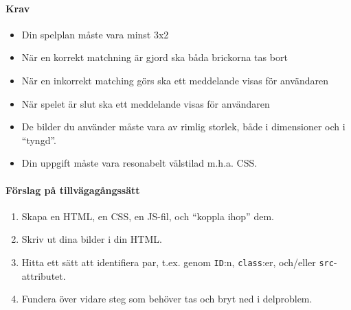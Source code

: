 \documentclass[12pt]{article}
\begin{document}
  \paragraph{Krav}
  \begin{itemize}
    \item Din spelplan måste vara minst 3x2
    \item När en korrekt matchning är gjord ska båda brickorna tas bort
    \item När en inkorrekt matching görs ska ett meddelande visas för användaren
    \item När spelet är slut ska ett meddelande visas för användaren
    \item De bilder du använder måste vara av rimlig storlek, både i dimensioner och i ``tyngd''.
    \item Din uppgift måste vara resonabelt välstilad m.h.a. CSS.
  \end{itemize}

  \paragraph{Förslag på tillvägagångssätt}
  \begin{enumerate}
    \item Skapa en HTML, en CSS, en JS-fil, och ``koppla ihop'' dem.
    \item Skriv ut dina bilder i din HTML.
    \item Hitta ett sätt att identifiera par, t.ex. genom \texttt{ID}:n, \texttt{class}:er, och/eller \texttt{src}-attributet.
    \item Fundera över vidare steg som behöver tas och bryt ned i delproblem.
  \end{enumerate}
\end{document}
